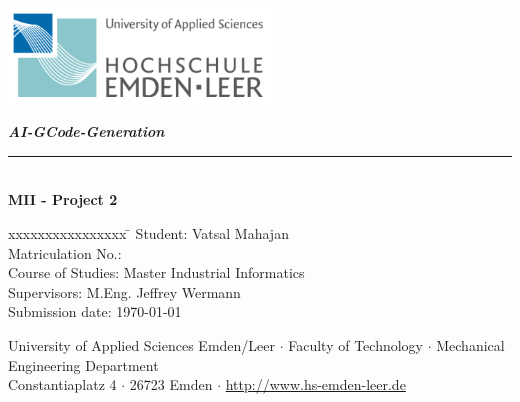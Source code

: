 %
%

\begin{titlepage}
    
    \begin{flushleft} 
        \includegraphics[width=7cm]{General/Logo.png}
    \end{flushleft} 
    
    \begin{flushright}
        \vspace{2cm}
        \textbf{\LARGE \textsl{AI-GCode-Generation}}\\
        \rule{0.6\textwidth}{0.4pt} ~\\
        \vspace{0.5cm}
        \textbf{\textsf{\LARGE MII - Project 2}}\\
    \end{flushright}
    
    \vspace{2cm}
    \large
    \begin{tabbing}
        xxxxxxxxxxxxxxxx \= \kill
        Student: \> Vatsal Mahajan\\
		Matriculation No.: \\ [0.5cm]
		
        Course of Studies: \> Master Industrial Informatics \\ [0.5cm]
       
        Supervisors: \> M.Eng. Jeffrey Wermann\\ [0.5cm]
        Submission date: \> \today \\
    \end{tabbing}
    
    \vspace{3cm}
    \small
    \begin{center}
        University of Applied Sciences Emden/Leer $\cdot$ 
        Faculty of Technology $\cdot$ 
        Mechanical Engineering Department \\
        Constantiaplatz 4 $\cdot$ 
        26723 Emden $\cdot$ 
        \url{http://www.hs-emden-leer.de}
    \end{center}
    
\end{titlepage}
